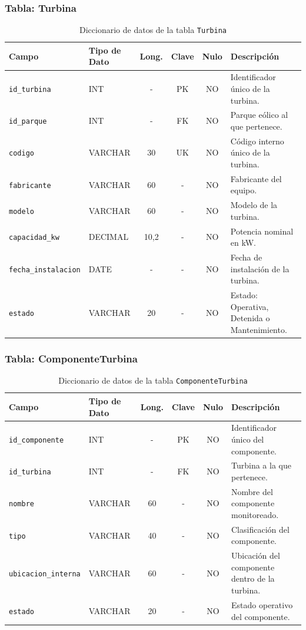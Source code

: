 \documentclass[11pt,a4paper]{article}
\begin{document}
\subsubsection{Tabla: Turbina}
\begin{table}[H]
\centering
\small
\caption{Diccionario de datos de la tabla \texttt{Turbina}}
\begin{tabular}{|l|l|c|c|c|p{5.1cm}|}
\hline
\textbf{Campo} & \textbf{Tipo de Dato} & \textbf{Long.} & \textbf{Clave} & \textbf{Nulo} & \textbf{Descripción} \\ \hline
\texttt{id\_turbina} & INT & - & PK & NO & Identificador único de la turbina. \\ \hline
\texttt{id\_parque} & INT & - & FK & NO & Parque eólico al que pertenece. \\ \hline
\texttt{codigo} & VARCHAR & 30 & UK & NO & Código interno único de la turbina. \\ \hline
\texttt{fabricante} & VARCHAR & 60 & - & NO & Fabricante del equipo. \\ \hline
\texttt{modelo} & VARCHAR & 60 & - & NO & Modelo de la turbina. \\ \hline
\texttt{capacidad\_kw} & DECIMAL & 10,2 & - & NO & Potencia nominal en kW. \\ \hline
\texttt{fecha\_instalacion} & DATE & - & - & NO & Fecha de instalación de la turbina. \\ \hline
\texttt{estado} & VARCHAR & 20 & - & NO & Estado: Operativa, Detenida o Mantenimiento. \\ \hline
\end{tabular}
\end{table}

\subsubsection{Tabla: ComponenteTurbina}
\begin{table}[H]
\centering
\small
\caption{Diccionario de datos de la tabla \texttt{ComponenteTurbina}}
\begin{tabular}{|l|l|c|c|c|p{5.1cm}|}
\hline
\textbf{Campo} & \textbf{Tipo de Dato} & \textbf{Long.} & \textbf{Clave} & \textbf{Nulo} & \textbf{Descripción} \\ \hline
\texttt{id\_componente} & INT & - & PK & NO & Identificador único del componente. \\ \hline
\texttt{id\_turbina} & INT & - & FK & NO & Turbina a la que pertenece. \\ \hline
\texttt{nombre} & VARCHAR & 60 & - & NO & Nombre del componente monitoreado. \\ \hline
\texttt{tipo} & VARCHAR & 40 & - & NO & Clasificación del componente. \\ \hline
\texttt{ubicacion\_interna} & VARCHAR & 60 & - & NO & Ubicación del componente dentro de la turbina. \\ \hline
\texttt{estado} & VARCHAR & 20 & - & NO & Estado operativo del componente. \\ \hline
\end{tabular}
\end{table}
\end{document}
